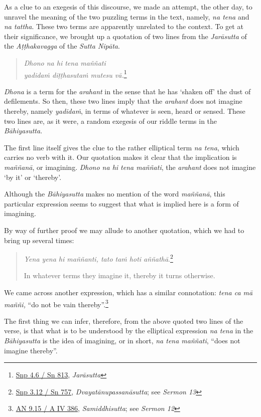 As a clue to an exegesis of this discourse, we made an attempt, the other day, to unravel the meaning of the two puzzling terms in the text, namely, \emph{na tena} and \emph{na tattha}. These two terms are apparently unrelated to the context. To get at their significance, we brought up a quotation of two lines from the \emph{Jarāsutta} of the \emph{Aṭṭhakavagga} of the \emph{Sutta Nipāta}.

\begin{quote}
\emph{Dhono na hi tena maññati}\\
\emph{yadidaṁ diṭṭhasutaṁ mutesu vā.}\footnote{\href{https://suttacentral.net/snp4.6/pli/ms}{Snp 4.6 / Sn 813}, \emph{Jarāsutta}}
\end{quote}

\emph{Dhona} is a term for the \emph{arahant} in the sense that he has `shaken off' the dust of defilements. So then, these two lines imply that the \emph{arahant} does not imagine thereby, namely \emph{yadidaṁ}, in terms of whatever is seen, heard or sensed. These two lines are, as it were, a random exegesis of our riddle terms in the \emph{Bāhiyasutta}.

The first line itself gives the clue to the rather elliptical term \emph{na tena}, which carries no verb with it. Our quotation makes it clear that the implication is \emph{maññanā}, or imagining. \emph{Dhono na hi tena maññati}, the \emph{arahant} does not imagine `by it' or `thereby'.

Although the \emph{Bāhiyasutta} makes no mention of the word \emph{maññanā}, this particular expression seems to suggest that what is implied here is a form of imagining.

By way of further proof we may allude to another quotation, which we had to bring up several times:

\begin{quote}
\emph{Yena yena hi maññanti, tato taṁ hoti aññathā}.\footnote{\href{https://suttacentral.net/snp3.12/pli/ms}{Snp 3.12 / Sn 757}, \emph{Dvayatānupassanāsutta}; see \emph{Sermon 13}}

In whatever terms they imagine it, thereby it turns otherwise.
\end{quote}

We came across another expression, which has a similar connotation: \emph{tena ca mā maññi,} ``do not be vain thereby''.\footnote{\href{https://suttacentral.net/an9.15/pli/ms}{AN 9.15 / A IV 386}, \emph{Samiddhisutta}; see \emph{Sermon 12}}

The first thing we can infer, therefore, from the above quoted two lines of the verse, is that what is to be understood by the elliptical expression \emph{na tena} in the \emph{Bāhiyasutta} is the idea of imagining, or in short, \emph{na tena maññati}, ``does not imagine thereby''.

